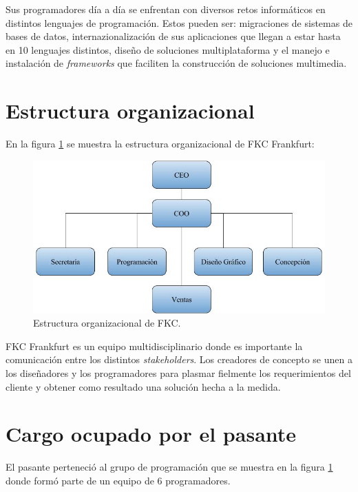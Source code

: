 Sus programadores día a día se enfrentan con diversos retos informáticos en distintos lenguajes de programación. Estos pueden ser: migraciones de sistemas de bases de datos, internazionalización de sus aplicaciones que llegan a estar hasta en 10 lenguajes distintos, diseño de soluciones multiplataforma y el manejo e instalación de \emph{frameworks} que faciliten la construcción de soluciones multimedia.

\section{Estructura organizacional}

En la figura \ref{fig:estructuraFKC} se muestra la estructura organizacional de FKC Frankfurt:

\begin{figure}[h]
\begin{center}
	\includegraphics[width=\textwidth]{figuras/estructuraFKC.jpg}
	\caption{Estructura organizacional de FKC.} \label{fig:estructuraFKC}
\end{center}
\end{figure}

FKC Frankfurt es un equipo multidisciplinario donde es importante la comunicación entre los distintos \emph{stakeholders}. Los creadores de concepto se unen a los diseñadores y los programadores para plasmar fielmente los requerimientos del cliente y obtener como resultado una solución hecha a la medida.

\section{Cargo ocupado por el pasante} 

El pasante perteneció al grupo de programación que se muestra en la figura \ref{fig:estructuraFKC} donde formó parte de un equipo de 6 programadores.



